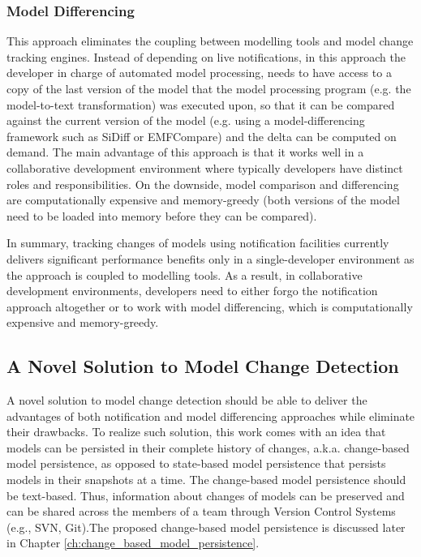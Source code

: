 \subsubsection{Model Differencing}
\label{sec:model_differencing}
  This approach eliminates the coupling between 
modelling tools and model change tracking engines. Instead of depending on 
live notifications, in this approach the developer in charge of automated model 
processing, needs to have access to a copy of the last version of the model that the model processing program (e.g. the model-to-text transformation) was 
executed upon, so that it can be compared against the current version of 
the model (e.g. using a model-differencing framework such as SiDiff or 
EMFCompare) and the delta can be computed on demand. The main advantage of 
this approach is that it works well in a collaborative development environment 
where typically developers have distinct roles and responsibilities. On the 
downside, model comparison and differencing are computationally expensive and 
memory-greedy (both versions of the model need to be loaded into memory before 
they can be compared).

In summary, tracking changes of models using notification facilities currently delivers significant performance benefits only in a single-developer environment as the approach is coupled to modelling tools. 
As a result, in collaborative development environments, 
developers need to either forgo the notification approach altogether 
or to work with model differencing, which is computationally expensive and 
memory-greedy.

\subsection{A Novel Solution to Model Change Detection}
\label{sec:a_novel_solution_to_model_change_detection}
A novel solution to model change detection should be able to deliver the advantages of both notification and model differencing approaches while eliminate their drawbacks. To realize such solution, this work comes with an idea that models can be persisted in their complete history of changes, a.k.a. change-based model persistence, as opposed to state-based model persistence that persists models in their snapshots at a time. The change-based model persistence should be text-based. Thus, information about changes of models can be preserved and can be shared across the members of a team through Version Control Systems (e.g., SVN, Git).The proposed change-based model persistence is discussed later in Chapter \ref{ch:change_based_model_persistence}. 

